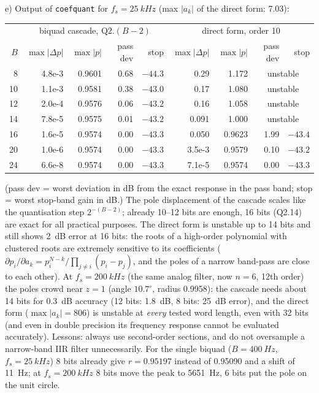 \begin{solution}
e) Output of \texttt{coefquant} for $f_s=\SI{25}{kHz}$ (max $|a_k|$ of the
direct form: 7.03):
\begin{center}
\small
\begin{tabular}{@{}r|rrrr|rrrr@{}}
\toprule
 & \multicolumn{4}{c|}{biquad cascade, Q2.$(B-2)$} & \multicolumn{4}{c}{direct form, order 10}\\
$B$ & $\max|\Delta p|$ & $\max|p|$ & pass dev & stop & $\max|\Delta p|$ & $\max|p|$ & pass dev & stop\\
\midrule
 8 & 4.8e-3 & 0.9601 & 0.68 & $-44.3$ & 0.29 & 1.172 & \multicolumn{2}{c}{unstable}\\
10 & 1.1e-3 & 0.9581 & 0.38 & $-43.0$ & 0.17 & 1.080 & \multicolumn{2}{c}{unstable}\\
12 & 2.0e-4 & 0.9576 & 0.06 & $-43.2$ & 0.16 & 1.058 & \multicolumn{2}{c}{unstable}\\
14 & 7.8e-5 & 0.9575 & 0.01 & $-43.2$ & 0.091 & 1.000 & \multicolumn{2}{c}{unstable}\\
16 & 1.6e-5 & 0.9574 & 0.00 & $-43.3$ & 0.050 & 0.9623 & 1.99 & $-43.4$\\
20 & 1.0e-6 & 0.9574 & 0.00 & $-43.3$ & 3.5e-3 & 0.9579 & 0.10 & $-43.2$\\
24 & 6.6e-8 & 0.9574 & 0.00 & $-43.3$ & 7.1e-5 & 0.9574 & 0.00 & $-43.3$\\
\bottomrule
\end{tabular}
\end{center}
(pass dev = worst deviation in dB from the exact response in the pass band;
stop = worst stop-band gain in dB.)
The pole displacement of the cascade scales like the quantisation step
$2^{-(B-2)}$; already 10--12 bits are enough, 16 bits (Q2.14) are exact for
all practical purposes. The direct form is unstable up to 14 bits and still
shows \SI{2}{dB} error at 16 bits: the roots of a high-order polynomial with
clustered roots are extremely sensitive to its coefficients
($\partial p_i/\partial a_k = p_i^{N-k}/\prod_{j\ne i}(p_i-p_j)$, and the poles of
a narrow band-pass are close to each other). At $f_s=\SI{200}{kHz}$
(the same analog filter, now $n=6$, 12th order) the poles crowd near $z=1$
(angle $10.7^\circ$, radius 0.9958): the cascade needs about 14 bits for
\SI{0.3}{dB} accuracy (12 bits: \SI{1.8}{dB}, 8 bits: \SI{25}{dB} error), and the
direct form ($\max|a_k|=806$) is unstable at \emph{every} tested word length,
even with 32 bits (and even in double precision its frequency response cannot be
evaluated accurately). Lessons: always use second-order sections, and do not
oversample a narrow-band IIR filter unnecessarily.
For the single biquad ($B=\SI{400}{Hz}$, $f_s=\SI{25}{kHz}$) 8 bits already give
$r=0.95197$ instead of 0.95090 and a shift of \SI{11}{Hz}; at
$f_s=\SI{200}{kHz}$ 8 bits move the peak to \SI{5651}{Hz}, 6 bits put the pole on the
unit circle.


\end{solution}
